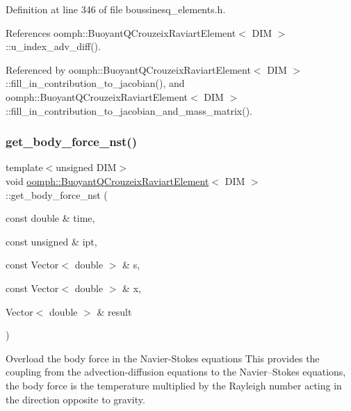 Definition at line 346 of file boussinesq\+\_\+elements.\+h.



References oomph\+::\+Buoyant\+Q\+Crouzeix\+Raviart\+Element$<$ D\+I\+M $>$\+::u\+\_\+index\+\_\+adv\+\_\+diff().



Referenced by oomph\+::\+Buoyant\+Q\+Crouzeix\+Raviart\+Element$<$ D\+I\+M $>$\+::fill\+\_\+in\+\_\+contribution\+\_\+to\+\_\+jacobian(), and oomph\+::\+Buoyant\+Q\+Crouzeix\+Raviart\+Element$<$ D\+I\+M $>$\+::fill\+\_\+in\+\_\+contribution\+\_\+to\+\_\+jacobian\+\_\+and\+\_\+mass\+\_\+matrix().

\mbox{\label{classoomph_1_1BuoyantQCrouzeixRaviartElement_aeeef7868070fd692b33e5afa811af1da}} 
\subsubsection{\texorpdfstring{get\+\_\+body\+\_\+force\+\_\+nst()}{get\_body\_force\_nst()}}
{\footnotesize\ttfamily template$<$unsigned D\+IM$>$ \\
void \hyperlink{classoomph_1_1BuoyantQCrouzeixRaviartElement}{oomph\+::\+Buoyant\+Q\+Crouzeix\+Raviart\+Element}$<$ D\+IM $>$\+::get\+\_\+body\+\_\+force\+\_\+nst (\begin{DoxyParamCaption}\item[{const double \&}]{time,  }\item[{const unsigned \&}]{ipt,  }\item[{const Vector$<$ double $>$ \&}]{s,  }\item[{const Vector$<$ double $>$ \&}]{x,  }\item[{Vector$<$ double $>$ \&}]{result }\end{DoxyParamCaption})\hspace{0.3cm}{\ttfamily [inline]}}



Overload the body force in the Navier-\/\+Stokes equations This provides the coupling from the advection-\/diffusion equations to the Navier--Stokes equations, the body force is the temperature multiplied by the Rayleigh number acting in the direction opposite to gravity. 



